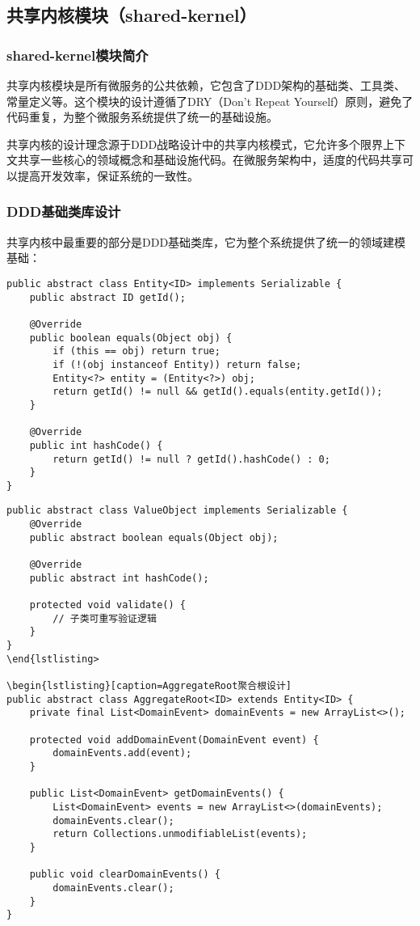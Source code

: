\documentclass[a4paper,12pt]{article}
\begin{document}
\subsection{共享内核模块（shared-kernel）}

\subsubsection{shared-kernel模块简介}

共享内核模块是所有微服务的公共依赖，它包含了DDD架构的基础类、工具类、常量定义等。这个模块的设计遵循了DRY（Don't Repeat Yourself）原则，避免了代码重复，为整个微服务系统提供了统一的基础设施。

共享内核的设计理念源于DDD战略设计中的共享内核模式，它允许多个限界上下文共享一些核心的领域概念和基础设施代码。在微服务架构中，适度的代码共享可以提高开发效率，保证系统的一致性。

\subsubsection{DDD基础类库设计}

共享内核中最重要的部分是DDD基础类库，它为整个系统提供了统一的领域建模基础：

\begin{lstlisting}[caption=Entity基类设计]
public abstract class Entity<ID> implements Serializable {
    public abstract ID getId();
    
    @Override
    public boolean equals(Object obj) {
        if (this == obj) return true;
        if (!(obj instanceof Entity)) return false;
        Entity<?> entity = (Entity<?>) obj;
        return getId() != null && getId().equals(entity.getId());
    }
    
    @Override
    public int hashCode() {
        return getId() != null ? getId().hashCode() : 0;
    }
}
\end{lstlisting}

\begin{lstlisting}[caption=ValueObject基类设计]
public abstract class ValueObject implements Serializable {
    @Override
    public abstract boolean equals(Object obj);
    
    @Override
    public abstract int hashCode();
    
    protected void validate() {
        // 子类可重写验证逻辑
    }
}
\end{lstlisting>

\begin{lstlisting}[caption=AggregateRoot聚合根设计]
public abstract class AggregateRoot<ID> extends Entity<ID> {
    private final List<DomainEvent> domainEvents = new ArrayList<>();
    
    protected void addDomainEvent(DomainEvent event) {
        domainEvents.add(event);
    }
    
    public List<DomainEvent> getDomainEvents() {
        List<DomainEvent> events = new ArrayList<>(domainEvents);
        domainEvents.clear();
        return Collections.unmodifiableList(events);
    }
    
    public void clearDomainEvents() {
        domainEvents.clear();
    }
}
\end{lstlisting}
\end{document}
